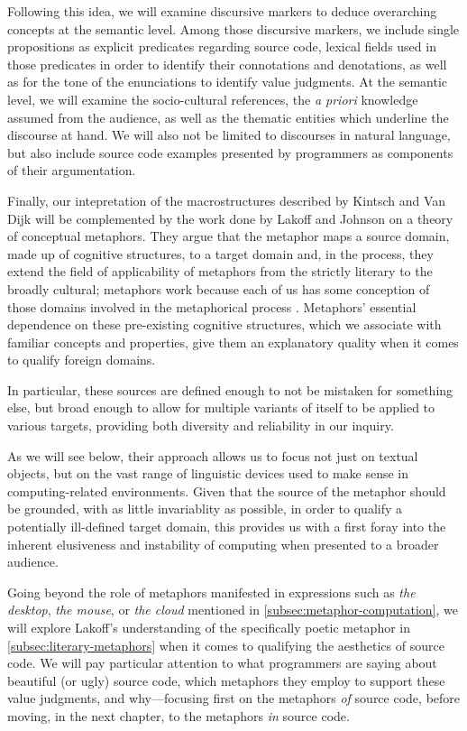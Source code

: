 Following this idea, we will examine discursive markers to deduce overarching concepts at the semantic level. Among those discursive markers, we include single propositions as explicit predicates regarding source code, lexical fields used in those predicates in order to identify their connotations and denotations, as well as for the tone of the enunciations to identify value judgments. At the semantic level, we will examine the socio-cultural references, the \emph{a priori} knowledge assumed from the audience, as well as the thematic entities which underline the discourse at hand. We will also not be limited to discourses in natural language, but also include source code examples presented by programmers as components of their argumentation.

Finally, our intepretation of the macrostructures described by Kintsch and Van Dijk will be complemented by the work done by Lakoff and Johnson on a theory of conceptual metaphors. They argue that the metaphor maps a source domain, made up of cognitive structures, to a target domain and, in the process, they extend the field of applicability of metaphors from the strictly literary to the broadly cultural; metaphors work because each of us has some conception of those domains involved in the metaphorical process \citep{lakoff_metaphors_1980,lakoff_conceptual_1980}.  Metaphors' essential dependence on these pre-existing cognitive structures, which we associate with familiar concepts and properties, give them an explanatory quality when it comes to qualify foreign domains.

In particular, these sources are defined enough to not be mistaken for something else, but broad enough to allow for multiple variants of itself to be applied to various targets, providing both diversity and reliability in our inquiry.

As we will see below, their approach allows us to focus not just on textual objects, but on the vast range of linguistic devices used to make sense in computing-related environments. Given that the source of the metaphor should be grounded, with as little invariablity as possible, in order to qualify a potentially ill-defined target domain, this provides us with a first foray into the inherent elusiveness and instability of computing when presented to a broader audience.

Going beyond the role of metaphors manifested in expressions such as \emph{the desktop}, \emph{the mouse}, or \emph{the cloud} mentioned in \autoref{subsec:metaphor-computation}, we will explore Lakoff's understanding of the specifically poetic metaphor in \autoref{subsec:literary-metaphors} when it comes to qualifying the aesthetics of source code. We will pay particular attention to what programmers are saying about beautiful (or ugly) source code, which metaphors they employ to support these value judgments, and why—focusing first on the metaphors \emph{of} source code, before moving, in the next chapter, to the metaphors \emph{in} source code.


